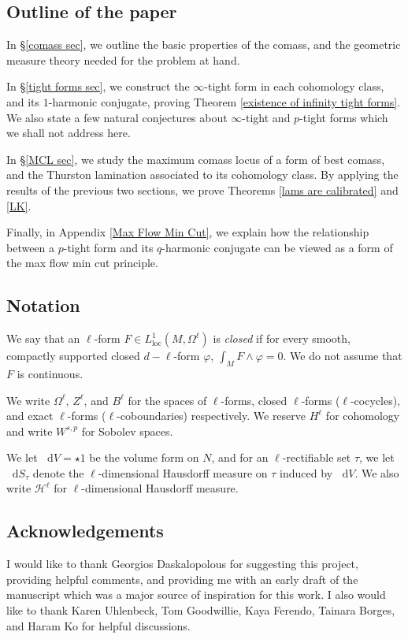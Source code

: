 \documentclass[reqno,11pt]{amsart}
\newcommand*\dif{\mathop{}\!\mathrm{d}}
\newcommand{\dfn}[1]{\emph{#1}\index{#1}}
\newcommand{\loc}{\mathrm{loc}}
\theoremstyle{definition}
\numberwithin{equation}{section}
\begin{document}
\subsection{Outline of the paper}
In \S\ref{comass sec}, we outline the basic properties of the comass, and the geometric measure theory needed for the problem at hand.

In \S\ref{tight forms sec}, we construct the $\infty$-tight form in each cohomology class, and its $1$-harmonic conjugate, proving Theorem \ref{existence of infinity tight forms}.
We also state a few natural conjectures about $\infty$-tight and $p$-tight forms which we shall not address here.

In \S\ref{MCL sec}, we study the maximum comass locus of a form of best comass, and the Thurston lamination associated to its cohomology class.
By applying the results of the previous two sections, we prove Theorems \ref{lams are calibrated} and \ref{LK}.

Finally, in Appendix \ref{Max Flow Min Cut}, we explain how the relationship between a $p$-tight form and its $q$-harmonic conjugate can be viewed as a form of the max flow min cut principle.

\subsection{Notation}
We say that an $\ell$-form $F \in L^1_\loc(M, \Omega^\ell)$ is \dfn{closed} if for every smooth, compactly supported closed $d - \ell$-form $\varphi$, $\int_M F \wedge \varphi = 0$.
We do not assume that $F$ is continuous.

We write $\Omega^\ell$, $Z^\ell$, and $B^\ell$ for the spaces of $\ell$-forms, closed $\ell$-forms ($\ell$-cocycles), and exact $\ell$-forms ($\ell$-coboundaries) respectively.
We reserve $H^\ell$ for cohomology and write $W^{s, p}$ for Sobolev spaces.

We let $\dif V = \star 1$ be the volume form on $N$, and for an $\ell$-rectifiable set $\tau$, we let $\dif S_\tau$ denote the $\ell$-dimensional Hausdorff measure on $\tau$ induced by $\dif V$.
We also write $\mathcal H^\ell$ for $\ell$-dimensional Hausdorff measure.

\subsection{Acknowledgements}
I would like to thank Georgios Daskalopolous for suggesting this project, providing helpful comments, and providing me with an early draft of the manuscript \cite{daskalopoulos2023} which was a major source of inspiration for this work.
I also would like to thank Karen Uhlenbeck, Tom Goodwillie, Kaya Ferendo, Tainara Borges, and Haram Ko for helpful discussions.
\end{document}
